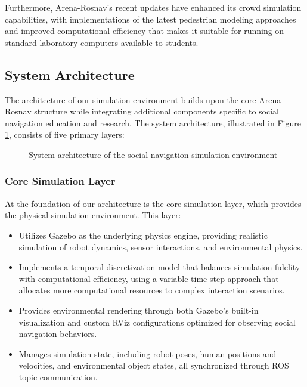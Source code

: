 Furthermore, Arena-Rosnav's recent updates have enhanced its crowd simulation capabilities, with implementations 
of the latest pedestrian modeling approaches and improved computational efficiency that makes it suitable 
for running on standard laboratory computers available to students.



\subsection{System Architecture}
The architecture of our simulation environment builds upon the core Arena-Rosnav structure while integrating 
additional components specific to social navigation education and research. The system architecture, 
illustrated in Figure \ref{fig:system_architecture}, consists of five primary layers:

\begin{figure}[h]
    \centering
    \caption{System architecture of the social navigation simulation environment}
    \label{fig:system_architecture}
\end{figure}

\subsubsection{Core Simulation Layer}
At the foundation of our architecture is the core simulation layer, which provides the physical 
simulation environment. This layer:
\begin{itemize}
    \item Utilizes Gazebo as the underlying physics engine, providing realistic simulation of 
    robot dynamics, sensor interactions, and environmental physics.
    \item Implements a temporal discretization model that balances simulation fidelity with 
    computational efficiency, using a variable time-step approach that allocates more 
    computational resources to complex interaction scenarios.
    \item Provides environmental rendering through both Gazebo's built-in visualization 
    and custom RViz configurations optimized for observing social navigation behaviors.
    \item Manages simulation state, including robot poses, human positions and velocities, 
    and environmental object states, all synchronized through ROS topic communication.
\end{itemize}

